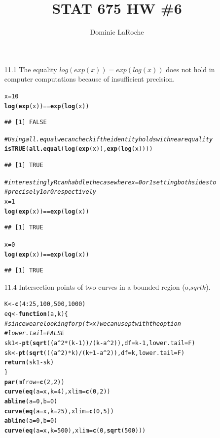 \documentclass{article}\usepackage[]{graphicx}\usepackage[]{color}
\title{STAT 675 HW \#6}
\author{Dominic LaRoche}
\makeatletter
\newcommand{\hlcom}[1]{\textcolor[rgb]{0.678,0.584,0.686}{\textit{#1}}}%
\newcommand{\hlkwd}[1]{\textcolor[rgb]{0.737,0.353,0.396}{\textbf{#1}}}%
\newenvironment{kframe}{%
 \def\at@end@of@kframe{}%
 \ifinner\ifhmode%
  \def\at@end@of@kframe{\end{minipage}}%
  \begin{minipage}{\columnwidth}%
 \fi\fi%
 \def\FrameCommand##1{\hskip\@totalleftmargin \hskip-\fboxsep
 \colorbox{shadecolor}{##1}\hskip-\fboxsep
     \hskip-\linewidth \hskip-\@totalleftmargin \hskip\columnwidth}%
 \MakeFramed {\advance\hsize-\width
   \@totalleftmargin\z@ \linewidth\hsize
   \@setminipage}}%
 {\par\unskip\endMakeFramed%
 \at@end@of@kframe}
\newenvironment{knitrout}{}{} %
\makeatother
\begin{document}
\begin{itemize}
\item[11.1] The equality $log(exp(x))=exp(log(x))$ does not hold in computer computations because of insufficient precision.\\
\begin{knitrout}
\color{fgcolor}\begin{kframe}
\begin{alltt}
x = 10
\hlkwd{log}(\hlkwd{exp}(x)) == \hlkwd{exp}(\hlkwd{log}(x))
\end{alltt}
\begin{verbatim}
## [1] FALSE
\end{verbatim}
\begin{alltt}
\hlcom{# Using all.equal we can check if the identity holds with near equality}
\hlkwd{isTRUE}(\hlkwd{all.equal}(\hlkwd{log}(\hlkwd{exp}(x)), \hlkwd{exp}(\hlkwd{log}(x))))
\end{alltt}
\begin{verbatim}
## [1] TRUE
\end{verbatim}
\begin{alltt}

\hlcom{# interestingly R can habdle the case where x=0 or 1 setting both sides to}
\hlcom{# precisely 1 or 0 respectively}
x = 1
\hlkwd{log}(\hlkwd{exp}(x)) == \hlkwd{exp}(\hlkwd{log}(x))
\end{alltt}
\begin{verbatim}
## [1] TRUE
\end{verbatim}
\begin{alltt}
x = 0
\hlkwd{log}(\hlkwd{exp}(x)) == \hlkwd{exp}(\hlkwd{log}(x))
\end{alltt}
\begin{verbatim}
## [1] TRUE
\end{verbatim}
\end{kframe}
\end{knitrout}


\item[11.4] Intersection points of two curves in a bounded region (o,$sqrt{k}$).\\
\begin{knitrout}
\color{fgcolor}\begin{kframe}
\begin{alltt}
K <- \hlkwd{c}(4:25, 100, 500, 1000)
eq <- \hlkwd{function}(a, k) \{
\hlcom{    # since we are looking for p(t>x) we can use pt with the option}
\hlcom{    # lower.tail=FALSE}
    sk1 <- \hlkwd{pt}(\hlkwd{sqrt}((a^2 * (k - 1))/(k - a^2)), df = k - 1, lower.tail = F)
    sk <- \hlkwd{pt}(\hlkwd{sqrt}(((a^2) * k)/(k + 1 - a^2)), df = k, lower.tail = F)
    \hlkwd{return}(sk1 - sk)
\}
\hlkwd{par}(mfrow = \hlkwd{c}(2, 2))
\hlkwd{curve}(\hlkwd{eq}(a = x, k = 4), xlim = \hlkwd{c}(0, 2))
\hlkwd{abline}(a = 0, b = 0)
\hlkwd{curve}(\hlkwd{eq}(a = x, k = 25), xlim = \hlkwd{c}(0, 5))
\hlkwd{abline}(a = 0, b = 0)
\hlkwd{curve}(\hlkwd{eq}(a = x, k = 500), xlim = \hlkwd{c}(0, \hlkwd{sqrt}(500)))
\end{alltt}



\end{kframe}
\end{knitrout}
\end{itemize}
\end{document}
